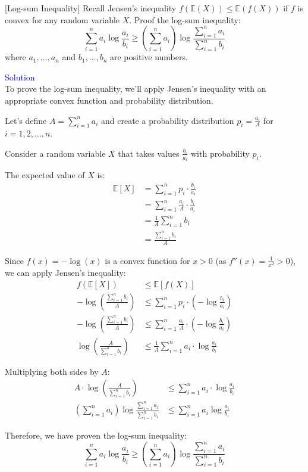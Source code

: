 \item {} [Log-sum Inequality] Recall Jensen's inequality $f(\mathbb{E}(X)) \leq \mathbb{E}(f(X))$ if $f$ is convex for any random variable $X$. Proof the log-sum inequality:
$$ \sum_{i=1}^{n} a_i \log \frac{a_i}{b_i} \geq \left( \sum_{i=1}^{n} a_i\right) \log \frac{\sum_{i=1}^{n} a_i}{\sum_{i=1}^{n} b_i} $$
where $a_1,\ldots,a_n$ and $b_1,\ldots,b_n$ are positive numbers.

\textcolor{blue}{Solution} \\

To prove the log-sum inequality, we'll apply Jensen's inequality with an appropriate convex function and probability distribution.

Let's define $A = \sum_{i=1}^{n} a_i$ and create a probability distribution $p_i = \frac{a_i}{A}$ for $i = 1, 2, \ldots, n$.

Consider a random variable $X$ that takes values $\frac{b_i}{a_i}$ with probability $p_i$.

The expected value of $X$ is:
\begin{align*}
\mathbb{E}[X] &= \sum_{i=1}^{n} p_i \cdot \frac{b_i}{a_i} \\
&= \sum_{i=1}^{n} \frac{a_i}{A} \cdot \frac{b_i}{a_i} \\
&= \frac{1}{A} \sum_{i=1}^{n} b_i \\
&= \frac{\sum_{i=1}^{n} b_i}{A}
\end{align*}

Since $f(x) = -\log(x)$ is a convex function for $x > 0$ (as $f''(x) = \frac{1}{x^2} > 0$), we can apply Jensen's inequality:
\begin{align*}
f(\mathbb{E}[X]) &\leq \mathbb{E}[f(X)] \\
-\log\left(\frac{\sum_{i=1}^{n} b_i}{A}\right) &\leq \sum_{i=1}^{n} p_i \cdot \left(-\log \frac{b_i}{a_i}\right) \\
-\log\left(\frac{\sum_{i=1}^{n} b_i}{A}\right) &\leq \sum_{i=1}^{n} \frac{a_i}{A} \cdot \left(-\log \frac{b_i}{a_i}\right) \\
\log\left(\frac{A}{\sum_{i=1}^{n} b_i}\right) &\leq \frac{1}{A} \sum_{i=1}^{n} a_i \cdot \log \frac{a_i}{b_i}
\end{align*}

Multiplying both sides by $A$:
\begin{align*}
A \cdot \log\left(\frac{A}{\sum_{i=1}^{n} b_i}\right) &\leq \sum_{i=1}^{n} a_i \cdot \log \frac{a_i}{b_i} \\
\left(\sum_{i=1}^{n} a_i\right) \log \frac{\sum_{i=1}^{n} a_i}{\sum_{i=1}^{n} b_i} &\leq \sum_{i=1}^{n} a_i \log \frac{a_i}{b_i}
\end{align*}

Therefore, we have proven the log-sum inequality:
$$ \sum_{i=1}^{n} a_i \log \frac{a_i}{b_i} \geq \left( \sum_{i=1}^{n} a_i\right) \log \frac{\sum_{i=1}^{n} a_i}{\sum_{i=1}^{n} b_i} $$
\newpage